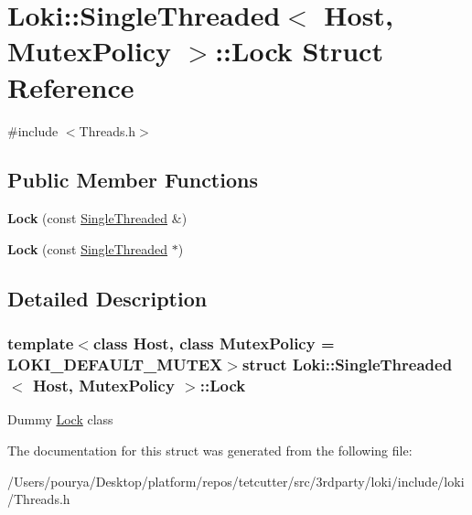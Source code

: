 \hypertarget{structLoki_1_1SingleThreaded_1_1Lock}{}\section{Loki\+:\+:Single\+Threaded$<$ Host, Mutex\+Policy $>$\+:\+:Lock Struct Reference}
\label{structLoki_1_1SingleThreaded_1_1Lock}


{\ttfamily \#include $<$Threads.\+h$>$}

\subsection*{Public Member Functions}
\begin{DoxyCompactItemize}
\item 
\hypertarget{structLoki_1_1SingleThreaded_1_1Lock_a4500e2b46f013628ab24de6cb3a4de4e}{}{\bfseries Lock} (const \hyperlink{classLoki_1_1SingleThreaded}{Single\+Threaded} \&)\label{structLoki_1_1SingleThreaded_1_1Lock_a4500e2b46f013628ab24de6cb3a4de4e}

\item 
\hypertarget{structLoki_1_1SingleThreaded_1_1Lock_ae2ac78676358c1a5d4bb3f51443af592}{}{\bfseries Lock} (const \hyperlink{classLoki_1_1SingleThreaded}{Single\+Threaded} $\ast$)\label{structLoki_1_1SingleThreaded_1_1Lock_ae2ac78676358c1a5d4bb3f51443af592}

\end{DoxyCompactItemize}


\subsection{Detailed Description}
\subsubsection*{template$<$class Host, class Mutex\+Policy = L\+O\+K\+I\+\_\+\+D\+E\+F\+A\+U\+L\+T\+\_\+\+M\+U\+T\+E\+X$>$struct Loki\+::\+Single\+Threaded$<$ Host, Mutex\+Policy $>$\+::\+Lock}

Dummy \hyperlink{structLoki_1_1SingleThreaded_1_1Lock}{Lock} class 

The documentation for this struct was generated from the following file\+:\begin{DoxyCompactItemize}
\item 
/\+Users/pourya/\+Desktop/platform/repos/tetcutter/src/3rdparty/loki/include/loki/Threads.\+h\end{DoxyCompactItemize}
